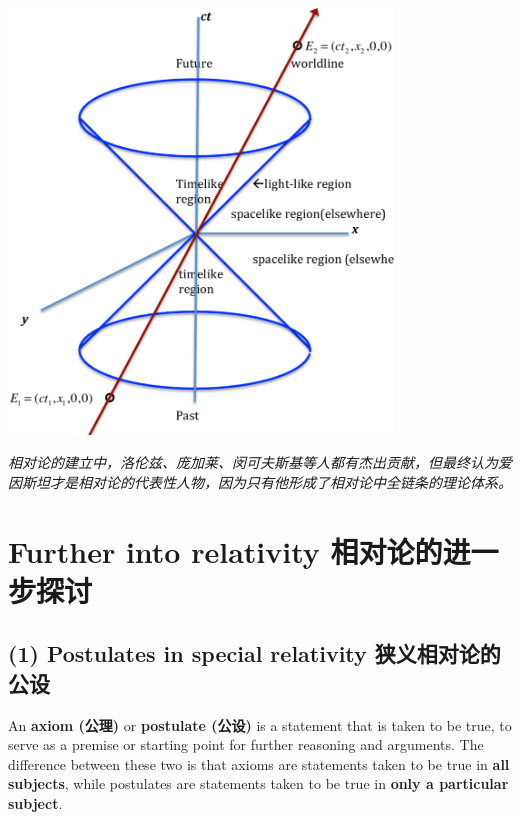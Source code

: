 \begin{center}
    \includegraphics[height=320pt]{assets/Minkowski_spacetime.png}
\end{center}

\emph{相对论的建立中，洛伦兹、庞加莱、闵可夫斯基等人都有杰出贡献，但最终认为爱因斯坦才是相对论的代表性人物，因为只有他形成了相对论中全链条的理论体系。}

\section{Further into relativity
相对论的进一步探讨}\label{further-into-relativity-ux76f8ux5bf9ux8bbaux7684ux8fdbux4e00ux6b65ux63a2ux8ba8}

\subsection*{(1) Postulates in special relativity
狭义相对论的公设}\label{postulates-in-special-relativity-ux72edux4e49ux76f8ux5bf9ux8bbaux7684ux516cux8bbe}

An \textbf{axiom (公理)} or \textbf{postulate (公设)} is a statement
that is taken to be true, to serve as a premise or starting point for
further reasoning and arguments. The difference between these two is
that axioms are statements taken to be true in \textbf{all subjects},
while postulates are statements taken to be true in \textbf{only a
particular subject}.

